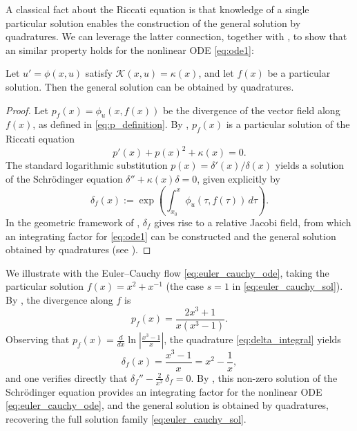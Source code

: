 \documentclass[preprint,a4paper]{elsarticle}
\begin{document}
A classical fact about the Riccati equation is that knowledge of a single particular solution enables the construction of the general solution by quadratures. We can leverage the latter connection, together with , to show that an similar property holds for the nonlinear ODE \eqref{eq:ode1}:

\begin{theorem}\label{thm:integration_from_particular}
Let $u' = \phi(x,u)$ satisfy $\mathcal{K}(x,u) = \kappa(x)$, and let $f(x)$ be a particular solution. Then the general solution can be obtained by quadratures.
\end{theorem}

\begin{proof}
Let $p_f(x) = \phi_u(x, f(x))$ be the divergence of the vector field along $f(x)$, as defined in \eqref{eq:p_definition}. By , $p_f(x)$ is a particular solution of the Riccati equation
\begin{equation}
    p'(x) + p(x)^2 + \kappa(x) = 0.
\end{equation}
The standard logarithmic substitution $p(x) = \delta'(x)/\delta(x)$ yields a solution of the Schrödinger equation $\delta'' + \kappa(x)\delta = 0$, given explicitly by
\begin{equation}\label{eq:delta_integral}
    \delta_f(x) := \exp\!\left(\int_{x_0}^x \phi_u(\tau, f(\tau))\, d\tau\right).
\end{equation}
In the geometric framework of \cite{surfaces2025,integrationJacobifields}, $\delta_f$ gives rise to a relative Jacobi field, from which an integrating factor for \eqref{eq:ode1} can be constructed and the general solution obtained by quadratures (see ).
\end{proof}

\begin{example}\label{ex:euler_cauchy_integration}
We illustrate  with the Euler--Cauchy flow \eqref{eq:euler_cauchy_ode}, taking the particular solution $f(x)=x^2+x^{-1}$ (the case $s=1$ in \eqref{eq:euler_cauchy_sol}). By , the divergence along $f$ is
\[
p_f(x)=\frac{2x^3+1}{x(x^3-1)}.
\]
Observing that $p_f(x)=\frac{d}{dx}\ln\!\left|\frac{x^3-1}{x}\right|$, the quadrature \eqref{eq:delta_integral} yields
\[
\delta_f(x)=\frac{x^3-1}{x}=x^2-\frac{1}{x},
\]
and one verifies directly that $\delta_f''-\frac{2}{x^2}\,\delta_f=0$. By , this non-zero solution of the Schrödinger equation provides an integrating factor for the nonlinear ODE \eqref{eq:euler_cauchy_ode}, and the general solution is obtained by quadratures, recovering the full solution family \eqref{eq:euler_cauchy_sol}.

\end{example}
\end{document}
